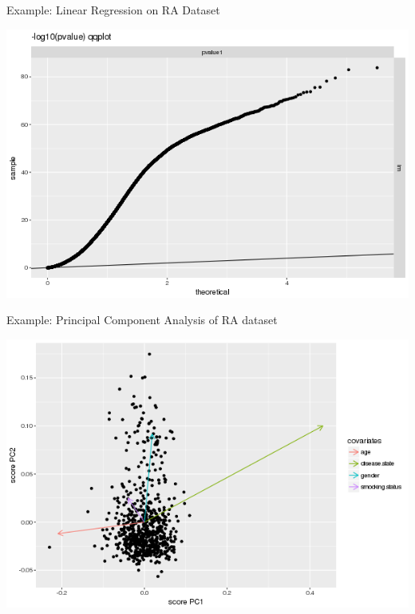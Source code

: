 \documentclass[presentation]{beamer}
\begin{document}
\begin{frame}[label={sec:org3cb5052}]{Example: Linear Regression on RA Dataset}
\begin{center}
\includegraphics[width=.9\linewidth]{./Rplots/GSE42861_qqplot_lm.png}
\end{center}
\end{frame}

\begin{frame}[label={sec:orgc9bdf17}]{Example: Principal Component Analysis of RA dataset}
\begin{center}
\includegraphics[width=.9\linewidth]{./Rplots/PC_RA.png}
\end{center}
\end{frame}
\end{document}

